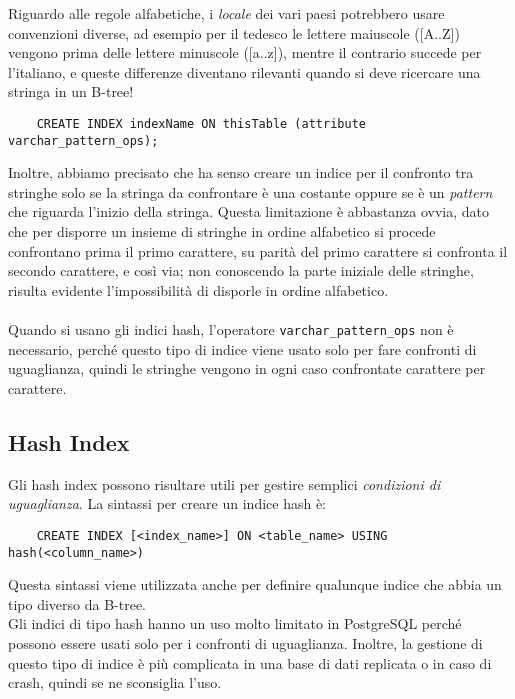\documentclass[12pt,a4paper]{book}
\begin{document}
	Riguardo alle regole alfabetiche, i \textit{locale} dei vari paesi potrebbero usare convenzioni diverse, ad esempio per il tedesco le lettere maiuscole ([A..Z]) vengono prima delle lettere minuscole ([a..z]), mentre il contrario succede per l'italiano, e queste differenze diventano rilevanti quando si deve ricercare una stringa in un B-tree!\\
	\begin{lstlisting}
	CREATE INDEX indexName ON thisTable (attribute varchar_pattern_ops);
	\end{lstlisting}
	Inoltre, abbiamo precisato che ha senso creare un indice per il confronto tra stringhe solo se la stringa da confrontare è una costante oppure se è un \textit{pattern} che riguarda l'inizio della stringa. Questa limitazione è abbastanza ovvia, dato che per disporre un insieme di stringhe in ordine alfabetico si procede confrontano prima il primo carattere, su parità del primo carattere si confronta il secondo carattere, e così via; non conoscendo la parte iniziale delle stringhe, risulta evidente l'impossibilità di disporle in ordine alfabetico.
	\paragraph{}Quando si usano gli indici hash, l'operatore \texttt{varchar_pattern_ops} non è necessario, perché questo tipo di indice viene usato solo per fare confronti di uguaglianza, quindi le stringhe vengono in ogni caso confrontate carattere per carattere.
	\subsection{Hash Index} Gli hash index possono risultare utili per gestire semplici \textit{condizioni di uguaglianza}. La sintassi per creare un indice hash è:
	\begin{lstlisting}
	CREATE INDEX [<index_name>] ON <table_name> USING hash(<column_name>)
	\end{lstlisting}
	Questa sintassi viene utilizzata anche per definire qualunque indice che abbia un tipo diverso da B-tree.\\
	Gli indici di tipo hash hanno un uso molto limitato in PostgreSQL perché possono essere usati solo per i confronti di uguaglianza. Inoltre, la gestione di questo tipo di indice è più complicata in una base di dati replicata o in caso di crash, quindi se ne sconsiglia l'uso.
\end{document}
